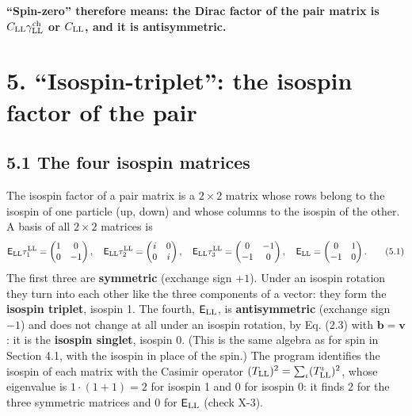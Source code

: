 \documentclass[
  10pt,
]{article}
\begin{document}
\textbf{``Spin-zero'' therefore means: the Dirac factor of the pair
matrix is \(C_{\rm LL}\gamma^{\rm ch}_{\rm LL}\) or \(C_{\rm LL}\), and
it is antisymmetric.}

\hypertarget{isospin-triplet-the-isospin-factor-of-the-pair}{%
\section{5. ``Isospin-triplet'': the isospin factor of the
pair}\label{isospin-triplet-the-isospin-factor-of-the-pair}}

\hypertarget{the-four-isospin-matrices}{%
\subsection{5.1 The four isospin
matrices}\label{the-four-isospin-matrices}}

The isospin factor of a pair matrix is a \(2\times2\) matrix whose rows
belong to the isospin of one particle (up, down) and whose columns to
the isospin of the other. A basis of all \(2\times2\) matrices is
\[\mathsf E_{\rm LL}\tau^{\rm LL}_1=\begin{pmatrix}1&0\\0&-1\end{pmatrix},\quad\mathsf E_{\rm LL}\tau^{\rm LL}_2=\begin{pmatrix}i&0\\0&i\end{pmatrix},\quad\mathsf E_{\rm LL}\tau^{\rm LL}_3=\begin{pmatrix}0&-1\\-1&0\end{pmatrix},\quad\mathsf E_{\rm LL}=\begin{pmatrix}0&1\\-1&0\end{pmatrix}. \tag{5.1}\]
The first three are \textbf{symmetric} (exchange sign \(+1\)). Under an
isospin rotation they turn into each other like the three components of
a vector: they form the \textbf{isospin triplet}, isospin 1. The fourth,
\(\mathsf E_{\rm LL}\), is \textbf{antisymmetric} (exchange sign \(-1\))
and does not change at all under an isospin rotation, by Eq. (2.3) with
\(\mathbf b=\mathbf v\): it is the \textbf{isospin singlet}, isospin 0.
(This is the same algebra as for spin in Section 4.1, with the isospin
in place of the spin.) The program identifies the isospin of each matrix
with the Casimir operator
\((T_{\rm LL})^2=\sum_\iota(T^\iota_{\rm LL})^2\), whose eigenvalue is
\(1\cdot(1+1)=2\) for isospin 1 and 0 for isospin 0: it finds 2 for the
three symmetric matrices and 0 for \(\mathsf E_{\rm LL}\) (check X-3).
\end{document}
